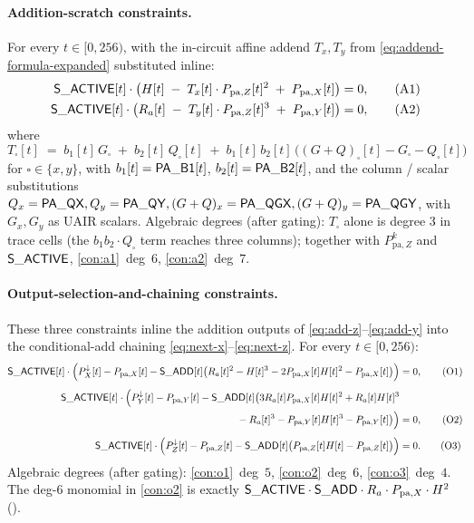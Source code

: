 \paragraph{Addition-scratch constraints.}

For every $t \in [0, 256)$, with the in-circuit affine addend
$T_x, T_y$ from \eqref{eq:addend-formula-expanded} substituted
inline:
\begin{align}
\mathsf{S\_ACTIVE}[t] \cdot \bigl(H[t] \;-\; T_x[t] \cdot P_{\mathrm{pa},Z}[t]^2 \;+\; P_{\mathrm{pa},X}[t]\bigr) &= 0,\tag{A1}\label{con:a1}\\
\mathsf{S\_ACTIVE}[t] \cdot \bigl(R_a[t] \;-\; T_y[t] \cdot P_{\mathrm{pa},Z}[t]^3 \;+\; P_{\mathrm{pa},Y}[t]\bigr) &= 0,\tag{A2}\label{con:a2}
\end{align}
where
\[
  T_\square[t] \;=\; b_1[t]\, G_\square \;+\; b_2[t]\, Q_\square[t]
                  \;+\; b_1[t]\, b_2[t]\,\bigl((G+Q)_\square[t] - G_\square - Q_\square[t]\bigr)
\]
for $\square \in \{x, y\}$, with $b_1[t] = \mathsf{PA\_B1}[t]$,
$b_2[t] = \mathsf{PA\_B2}[t]$, and the column / scalar substitutions
$Q_x = \mathsf{PA\_QX}, Q_y = \mathsf{PA\_QY}, (G+Q)_x = \mathsf{PA\_QGX},
(G+Q)_y = \mathsf{PA\_QGY}$, with $G_x, G_y$ as UAIR scalars.
Algebraic degrees (after gating): $T_\square$ alone is degree $3$
in trace cells (the $b_1 b_2 \cdot Q_\square$ term reaches three
columns); together with $P_{\mathrm{pa},Z}^k$ and $\mathsf{S\_ACTIVE}$,
\ref{con:a1}~deg~$6$, \ref{con:a2}~deg~$7$.

\paragraph{Output-selection-and-chaining constraints.}

These three constraints inline the addition outputs of
\eqref{eq:add-z}--\eqref{eq:add-y} into the conditional-add chaining
\eqref{eq:next-x}--\eqref{eq:next-z}. For every $t \in [0, 256)$:
\begin{align}
\mathsf{S\_ACTIVE}[t] \cdot \Bigl(P_X^{\downarrow}[t] - P_{\mathrm{pa},X}[t]
   - \mathsf{S\_ADD}[t] \bigl(R_a[t]^2 - H[t]^3 - 2 P_{\mathrm{pa},X}[t] H[t]^2 - P_{\mathrm{pa},X}[t]\bigr)\Bigr) &= 0, \tag{O1}\label{con:o1}\\[4pt]
\mathsf{S\_ACTIVE}[t] \cdot \Bigl(P_Y^{\downarrow}[t] - P_{\mathrm{pa},Y}[t]
   - \mathsf{S\_ADD}[t] \bigl(3 R_a[t] P_{\mathrm{pa},X}[t] H[t]^2 + R_a[t] H[t]^3 \notag\\
   {} - R_a[t]^3 - P_{\mathrm{pa},Y}[t] H[t]^3 - P_{\mathrm{pa},Y}[t]\bigr)\Bigr) &= 0, \tag{O2}\label{con:o2}\\[4pt]
\mathsf{S\_ACTIVE}[t] \cdot \Bigl(P_Z^{\downarrow}[t] - P_{\mathrm{pa},Z}[t]
   - \mathsf{S\_ADD}[t] \bigl(P_{\mathrm{pa},Z}[t] H[t] - P_{\mathrm{pa},Z}[t]\bigr)\Bigr) &= 0. \tag{O3}\label{con:o3}
\end{align}
Algebraic degrees (after gating): \ref{con:o1}~deg~$5$, \ref{con:o2}~deg~$6$, \ref{con:o3}~deg~$4$. The deg-$6$ monomial in
\ref{con:o2} is exactly $\mathsf{S\_ACTIVE} \cdot \mathsf{S\_ADD} \cdot R_a \cdot P_{\mathrm{pa},X} \cdot H^2$ ().

